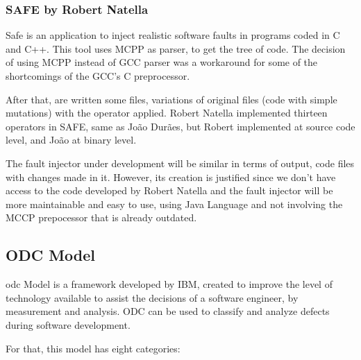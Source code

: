 \subsubsection{SAFE by Robert Natella}

Safe is an application to inject realistic software faults in programs coded in C and C++.
This tool uses MCPP as parser, to get the tree of code. The decision of using MCPP instead of GCC parser was a workaround for some of the shortcomings of the GCC's C preprocessor.

After that, are written some files, variations of original files (code with simple mutations) with the operator applied.
Robert Natella implemented thirteen operators in SAFE, same as João Durães\cite{duraes2006emulation}, but Robert implemented at source code level, and João at binary level.

The fault injector under development will be similar in terms of output, code files with changes made in it. However, its creation is justified since we don't have access to the code developed by Robert Natella and the fault injector will be more maintainable and easy to use, using Java Language and not involving the MCCP prepocessor that is already outdated.\\




\clearpage
\subsection{ODC Model}
\acl{odc}\cite{bridge1998orthogonal} Model is a framework developed by IBM\cite{chillarege2004orthogonal}, created to improve the level of technology available to assist the decisions of a software engineer, by measurement and analysis.
ODC can be used to classify and analyze defects during software development.

For that, this model has eight categories:

